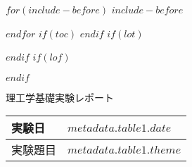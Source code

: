\documentclass[$if(fontsize)$$fontsize$,$endif$$if(lang)$$babel-lang$,$endif$$if(papersize)$$papersize$,$endif$$for(classoption)$$classoption$$sep$,$endfor$]{$documentclass$}
\begin{document}

$for(include-before)$
$include-before$

$endfor$
$if(toc)$
{
\hypersetup{linkcolor=$if(toccolor)$$toccolor$$else$black$endif$}
\setcounter{tocdepth}{$toc-depth$}
\tableofcontents
}
$endif$
$if(lot)$
\listoftables
$endif$
$if(lof)$
\listoffigures
$endif$



\newenvironment{boldtabular}{ \arrayrulewidth = 2pt }{}
\newenvironment{narrowtabular}{ \renewcommand{\arraystretch}{0.8} }{}
\newenvironment{titletabular}{ \renewcommand{\arraystretch}{1.1} }{}
\newenvironment{datetabular}{ \renewcommand{\arraystretch}{1.1} }{}
\newenvironment{templaturetabular}{ \renewcommand{\arraystretch}{1.18} }{}
\newenvironment{kotitle}{
\centering
  \fontsize{20pt}{20pt}\selectfont
}{}
\fontsize{11pt}{22pt}\selectfont

\vspace*{-13pt}
\begin{kotitle}
  理工学基礎実験レポート

\end{kotitle}

\vspace{19.5mm}

\begin{titletabular}
\begin{tabularx}{\textwidth}{|m{23mm}|X|}\hline
実験日 & $metadata.table1.date$ \\ \hline
\parbox[c][14mm][c]{0pt}{}実験題目  & $metadata.table1.theme$ \\ \hline
\end{tabularx}
\end{titletabular}

\vspace{10mm}

\end{document}
